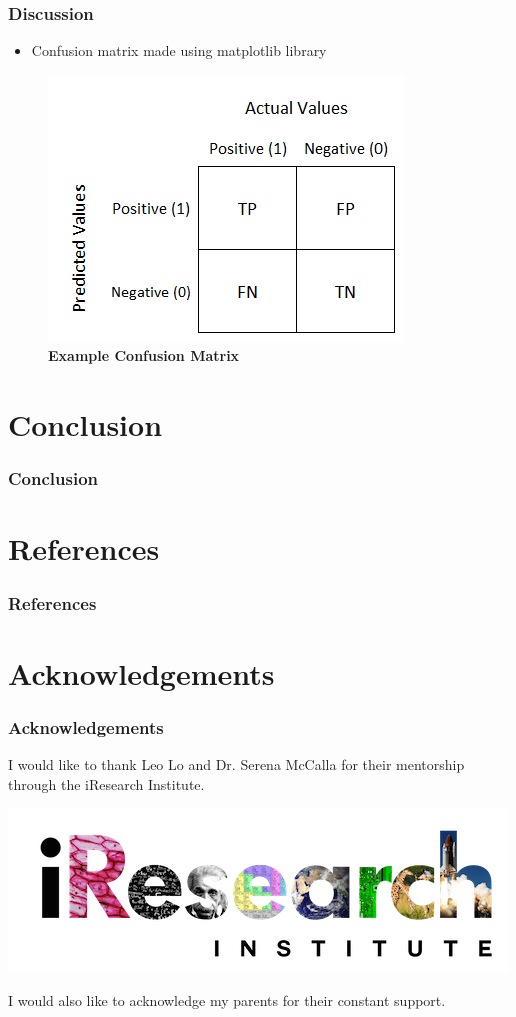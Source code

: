 \documentclass[12pt]{beamer}
\begin{document}
\begin{frame}
\frametitle{Discussion}
\pause
\begin{itemize}
  \item Confusion matrix made using matplotlib library
\end{itemize}
\pause
\begin{figure}[h]
  \includegraphics[scale = 0.5]{confusionmatrix.png}
  \caption{\textbf{Example Confusion Matrix}}
\end{figure}

\end{frame}

\section{Conclusion}

\begin{frame}
\frametitle{Conclusion}


\end{frame}

\section{References}
\begin{frame}
\frametitle{References}
\end{frame}


\section{Acknowledgements}


\begin{frame}
\frametitle{Acknowledgements}
I would like to thank Leo Lo and Dr. Serena McCalla for their mentorship through the iResearch Institute.

\begin{center}
\includegraphics[scale = 0.58]{iresearch.png}
\end{center}

I would also like to acknowledge my parents for their constant support.
\end{frame}
\end{document}
